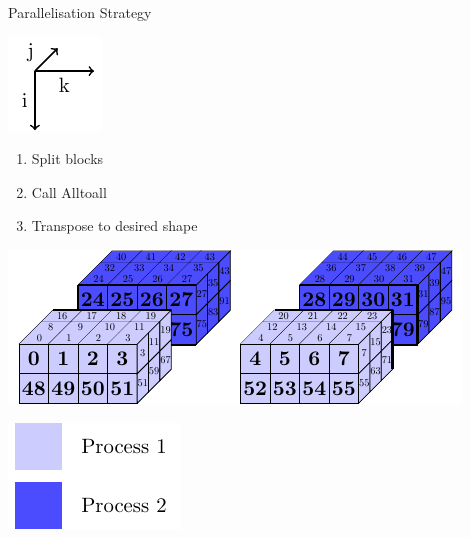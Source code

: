 \documentclass{beamer}
\begin{document}
\begin{frame}{Parallelisation Strategy}
 \begin{minipage}{.3\textwidth}
 \includegraphics[width=.4\textwidth]{SplitConcat3D/Axes}
 \vspace{4em}
 
  \begin{enumerate}
   \item Split blocks 
   \item Call Alltoall
   \item Transpose to desired shape
  \end{enumerate}
  
  \vspace{4em}
 \end{minipage}
 \begin{minipage}{.65\textwidth}
  \includegraphics[width=\textwidth]{SplitConcat3D/SendBlocksColouredDistrib2}
  
  \vspace{1em}
  
  \hfill\includegraphics[width=.3\textwidth]{SplitConcat3D/Legend}
 \end{minipage}
\end{frame}
\end{document}
